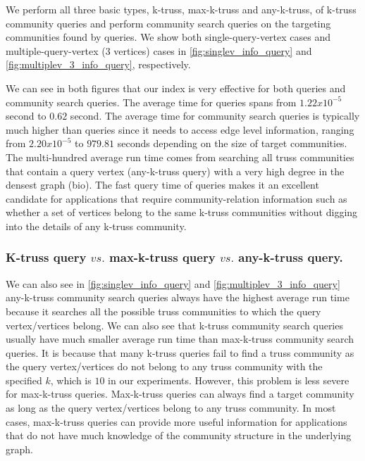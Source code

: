 We perform all three basic types, \ie k-truss, max-k-truss and any-k-truss, of \toplevelprob{} k-truss community queries and perform community search queries on the targeting communities found by \toplevelprob{} queries. We show both single-query-vertex cases and multiple-query-vertex ($3$ vertices) cases in \autoref{fig:singlev_info_query} and \autoref{fig:multiplev_3_info_query}, respectively. 

We can see in both figures that our index is very effective for both \toplevelprob{} queries and community search queries. The average time for \toplevelprob{} queries spans from $1.22 x 10^{-5}$ second to $0.62$ second. The average time for community search queries is typically much higher than \toplevelprob{} queries since it needs to access edge level information, ranging from $2.20 x 10^{-5}$ to $979.81$ seconds depending on the size of target communities. The multi-hundred average run time comes from searching all truss communities that contain a query vertex (any-k-truss query) with a very high degree in the densest graph (bio). The fast query time of \toplevelprob{} queries makes it an excellent candidate for applications that require community-relation information such as whether a set of vertices belong to the same k-truss communities without digging into the details of any k-truss community. 

\subsubsection{K-truss query $vs.$ max-k-truss query $vs.$ any-k-truss query.}
\label{eval_k_type_compare}

We can also see in \autoref{fig:singlev_info_query} and \autoref{fig:multiplev_3_info_query} any-k-truss community search queries always have the highest average run time because it searches all the possible truss communities to which the query vertex/vertices belong. We can also see that k-truss community search queries usually have much smaller average run time than max-k-truss community search queries. 
It is because that many k-truss queries fail to find a truss community as the query vertex/vertices do not belong to any truss community with the specified $k$, which is $10$ in our experiments. However, this problem is less severe for max-k-truss queries. Max-k-truss queries can always find a target community as long as the query vertex/vertices belong to any truss community. In most cases, max-k-truss queries can provide more useful information for applications that do not have much knowledge of the community structure in the underlying graph.

